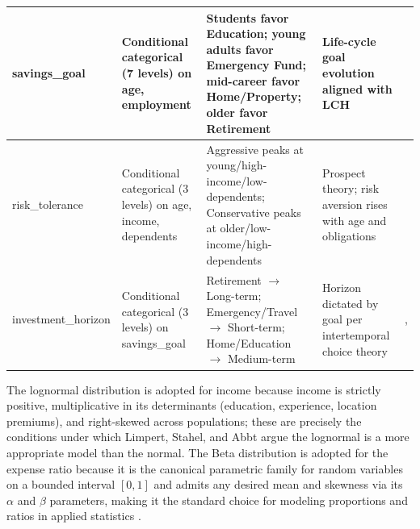 \documentclass{icsthesis}
\begin{document}
\begin{mainmatter}
{\begin{xltabular}{\textwidth}{|>{\raggedright\arraybackslash}p{0.14\textwidth}|X|X|X|>{\centering\arraybackslash}p{0.12\textwidth}|}
						\hline
						savings\_goal & Conditional categorical (7 levels) on age, employment & Students favor Education; young adults favor Emergency Fund; mid-career favor Home/Property; older favor Retirement & Life-cycle goal evolution aligned with LCH & \cite{ref65} \\
						\hline
						risk\_tolerance & Conditional categorical (3 levels) on age, income, dependents & Aggressive peaks at young/high-income/low-dependents; Conservative peaks at older/low-income/high-dependents & Prospect theory; risk aversion rises with age and obligations & \cite{ref62} \\
						\hline
						investment\_horizon & Conditional categorical (3 levels) on savings\_goal & Retirement $\to$ Long-term; Emergency/Travel $\to$ Short-term; Home/Education $\to$ Medium-term & Horizon dictated by goal per intertemporal choice theory & \cite{ref64}, \cite{ref84} \\
					\end{xltabular}\par}

					The lognormal distribution is adopted for income because income is strictly positive, multiplicative in its determinants (education, experience, location premiums), and right-skewed across populations; these are precisely the conditions under which Limpert, Stahel, and Abbt \cite{ref54} argue the lognormal is a more appropriate model than the normal. The Beta distribution is adopted for the expense ratio because it is the canonical parametric family for random variables on a bounded interval $[0,1]$ and admits any desired mean and skewness via its $\alpha$ and $\beta$ parameters, making it the standard choice for modeling proportions and ratios in applied statistics \cite{ref54}.


\end{mainmatter}
\end{document}
